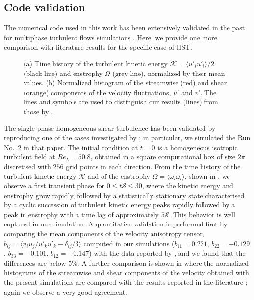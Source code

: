 \subsection{Code validation}
The numerical code used in this work has been extensively validated in the past for multiphase turbulent flows simulations \citep{rosti_brandt_2017a, rosti_banaei_brandt_mazzino_2018a, rosti_izbassarov_tammisola_hormozi_brandt_2018a}. Here, we provide one more comparison with literature results for the specific case of HST.
\begin{figure}
	\centering
	 \hspace{0.5cm}
	 \vspace{0.5cm}
\caption{(a) Time history of the turbulent kinetic energy $\mathcal{K}=\langle u'_i u'_i \rangle/2$ (black line) and enstrophy $\Omega$ (grey line), normalized by their mean values. (b) Normalized histogram of the streamwise (red) and shear (orange) components of the velocity fluctuations, $u'$ and $v'$. The lines and symbols are used to distinguish our results (lines) from those by \citet{pumir_1996a}.}
	\label{fig:pumir}
\end{figure}
The single-phase homogeneous shear turbulence has been validated by reproducing one of the cases investigated by \citet{pumir_1996a}; in particular, we simulated the Run No.~$2$ in that paper. The initial condition at $t = 0$ is a homogeneous isotropic turbulent field at $Re_\lambda = 50.8$, obtained in a square computational box of size $2\pi$ discretised with $256$ grid points in each direction. From the time history of the turbulent kinetic energy $\mathcal{K}$ and of the enstrophy $\Omega = \langle \omega_i \omega_i \rangle$, shown in , we observe a first transient phase for $0 \le t\mathcal{S} \le 30$, where the kinetic energy and enstrophy grow rapidly, followed by a statistically stationary state characterised by a cyclic succession of turbulent kinetic energy peaks rapidly followed by a peak in enstrophy with a time lag of approximately $5\mathcal{S}$. This behavior is well captured in our simulation. A quantitative validation is performed first by comparing the mean components of the velocity anisotropy tensor, $b_{ij}=\langle u_i u_j / u'_k u'_k - \delta_{ij}/3 \rangle$ computed in our simulations ($b_{11}=0.231$, $b_{22} = −0.129$, $b_{33} = −0.101$, $b_{12} = −0.147$) with the data reported by \citet{pumir_1996a}, and we found that the differences are below $5\%$. A further comparison is shown in  where the normalized histograms of the streamwise and shear components of the velocity obtained with the present  simulations are compared with the results reported in the literature \citep{pumir_1996a}; again we observe a very good agreement.

